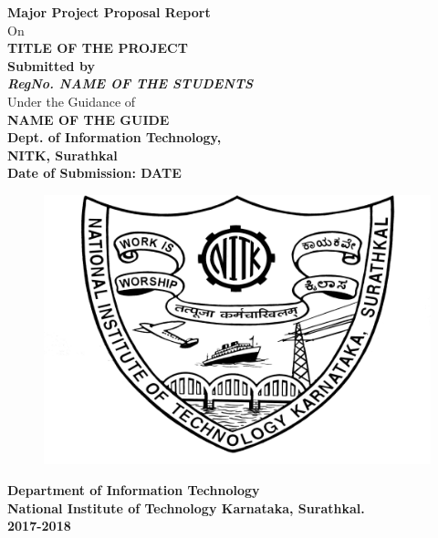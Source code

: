 \documentclass{report}[12pt,a4paper]
\begin{document}
\begin{titlepage}

    \centering
    \vspace{-3em}
    {\Large\textbf{Major Project Proposal Report}}\\
    \vspace{1.5em}
    On\\
    \vspace{1.5em}
    {\Huge \textbf{TITLE OF THE PROJECT}}\\
    \vspace{3em}
    {\LARGE \bfseries Submitted by}\\
    \vspace{2em}
    {\Large \emph{\textbf{RegNo.  NAME OF THE STUDENTS}}}\\
    \vspace{4em}
    {\Large Under the Guidance of}\\
    \vspace{2em}
    {\Large \textbf{NAME OF THE GUIDE}}\\
    \vspace{2em}
    {\Large \textbf{Dept. of Information Technology,}}\\
    \vspace{2em}
    {\Large \textbf{NITK, Surathkal}}\\
    \vspace{4em}
    {\Large \textbf{Date of Submission: DATE}}\\
    \vspace{1.5em}
    \begin{figure}[!ht]
        \centering
        \includegraphics{nitk-logo.png}
    \end{figure}
    \vspace{2em}
    {\Large \bfseries Department of Information Technology}\\
    \vspace{0.5em}
    {\Large \bfseries National Institute of Technology Karnataka, Surathkal.}\\
    \vspace{0.5em}
    {\Large \bfseries 2017-2018}
\end{titlepage}    
\end{document}
